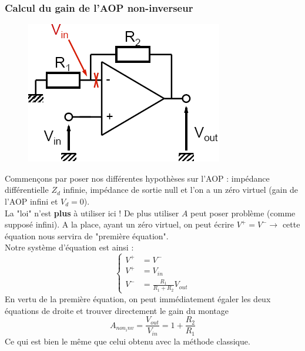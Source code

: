 \documentclass	[11pt, a4paper, openany]{book}
\begin{document}
\subsubsection{Calcul du gain de l'AOP non-inverseur}
\begin{figure}
\includegraphics[scale=0.35]{img/image49}
\end{figure}
Commençons par poser nos différentes hypothèses sur l'AOP : impédance différentielle $Z_d$ infinie, impédance de sortie null et l'on a un zéro virtuel (gain de l'AOP infini et $V_d = 0$).\\
La "loi" n'est \textbf{plus} à utiliser ici ! De plus utiliser $A$ peut poser problème (comme supposé infini). A la place, ayant un zéro virtuel, on peut écrire $V^+ = V^- \rightarrow$ cette équation nous servira de "première équation". \\
Notre système d'équation est ainsi :
\begin{equation}
\left\{\begin{array}{ll}
V^+ &= V^-\\
V^+ &= V_{in}\\
V^- &= \frac{R_1}{R_1+R_2}V_{out}
\end{array}\right.
\end{equation}
En vertu de la première équation, on peut immédiatement égaler les deux équations de droite et trouver directement le gain du montage
\begin{equation}
A_{non_inv} = \frac{V_{out}}{V_{in}} = 1+\frac{R_2}{R_1}
\end{equation}
Ce qui est bien le même que celui obtenu avec la méthode classique.\\
\end{document}
